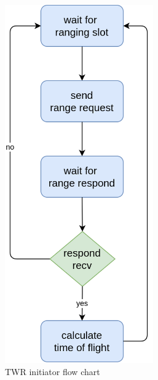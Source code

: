 \documentclass[\main/main.tex]{subfiles}
\begin{document}
\begin{figure}[H]
    \centering
    \begin{subfigure}[b]{0.47\textwidth}
        \begin{center}
            \includegraphics[width=0.7\textwidth]{twr_initiator.png}
        \end{center}
        \caption{TWR initiator flow chart}
        \label{fig:twr_initiator}
    \end{subfigure}
    \hfill
    \begin{subfigure}[b]{0.47\textwidth}
        \begin{center}

\end{center}
\end{subfigure}
\end{figure}
\end{document}
